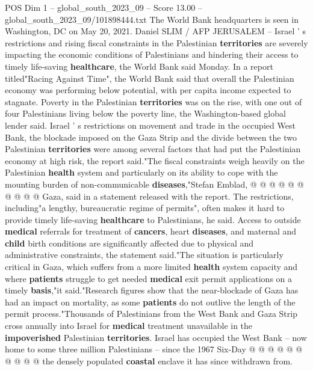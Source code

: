 \begin{textsample}{POS Dim 1 – global\_south\_2023\_09 – Score 13.00 – global\_south\_2023\_09/101898444.txt}  \label{ex:f1_pos_442}
The World Bank headquarters is seen in Washington, DC on May 20, 2021.
Daniel SLIM / AFP JERUSALEM -- Israel ' s restrictions and rising fiscal constraints in the Palestinian \textbf{territories} are severely impacting the economic conditions of Palestinians and hindering their access to timely life-saving \textbf{healthcare}, the World Bank said Monday.
In a report titled"Racing Against Time", the World Bank said that overall the Palestinian economy was performing below potential, with per capita income expected to stagnate.
Poverty in the Palestinian \textbf{territories} was on the rise, with one out of four Palestinians living below the poverty line, the Washington-based global lender said.
Israel ' s restrictions on movement and trade in the occupied West Bank, the blockade imposed on the Gaza Strip and the divide between the two Palestinian \textbf{territories} were among several factors that had put the Palestinian economy at high risk, the report said."The fiscal constraints weigh heavily on the Palestinian \textbf{health} system and particularly on its ability to cope with the mounting burden of non-communicable \textbf{diseases},"Stefan Emblad, @ @ @ @ @ @ @ @ @ @ Gaza, said in a statement released with the report.
The restrictions, including"a lengthy, bureaucratic regime of permits", often makes it hard to provide timely life-saving \textbf{healthcare} to Palestinians, he said.
Access to outside \textbf{medical} referrals for treatment of \textbf{cancers}, heart \textbf{diseases}, and maternal and \textbf{child} birth conditions are significantly affected due to physical and administrative constraints, the statement said."The situation is particularly critical in Gaza, which suffers from a more limited \textbf{health} system capacity and where \textbf{patients} struggle to get needed \textbf{medical} exit permit applications on a timely \textbf{basis},"it said."Research figures show that the near-blockade of Gaza has had an impact on mortality, as some \textbf{patients} do not outlive the length of the permit process."Thousands of Palestinians from the West Bank and Gaza Strip cross annually into Israel for \textbf{medical} treatment unavailable in the \textbf{impoverished} Palestinian \textbf{territories}.
Israel has occupied the West Bank -- now home to some three million Palestinians -- since the 1967 Six-Day @ @ @ @ @ @ @ @ @ @ the densely populated \textbf{coastal} enclave it has since withdrawn from.

\end{textsample}

